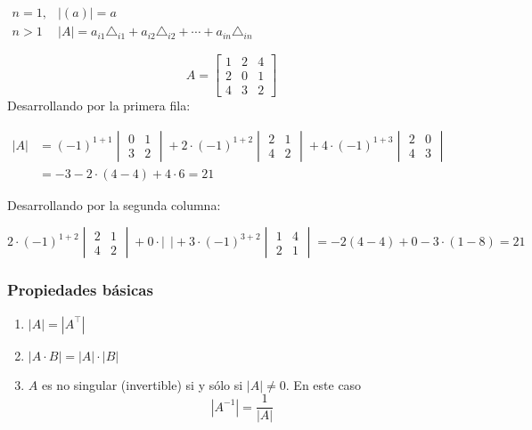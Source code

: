 $\begin{array}{ll}
	n=1, & |(a)|=a\\
	n>1 & |A|=a_{i1}\triangle_{i1}+a_{i2}\triangle_{i2}+\cdots+a_{in}\triangle_{in}
\end{array}$


\Ej
\[ A=\begin{bmatrix}
	1 & 2 & 4\\
	2 & 0 & 1\\
	4 & 3 & 2
\end{bmatrix} \]
Desarrollando por la primera fila:

$\begin{aligned}
	|A|& =(-1)^{1+1}\begin{vmatrix}
		0 & 1\\
		3 & 2
	\end{vmatrix}+2\cdot(-1)^{1+2}\begin{vmatrix}
	2 & 1\\
	4 & 2
	\end{vmatrix}+4\cdot(-1)^{1+3}\begin{vmatrix}
	2 & 0\\
	4 & 3
	\end{vmatrix}\\
	&=-3-2\cdot(4-4)+4\cdot6=21
\end{aligned}$

Desarrollando por la segunda columna:

$2\cdot(-1)^{1+2}\begin{vmatrix}
	2 & 1\\
	4 & 2
\end{vmatrix}+0\cdot|~~|+3\cdot(-1)^{3+2}\begin{vmatrix}
1 & 4\\
2 & 1
\end{vmatrix}=-2(4-4)+0-3\cdot(1-8)=21$
\subsubsection{Propiedades básicas}
\begin{enumerate}[label=\color{lightblue}\arabic*)]
	\item $|A|=|A^\intercal |$
	\item $|A\cdot B|=|A|\cdot|B|$
	\item $A$ es no singular (invertible) si y sólo si $|A|\neq0$. En este caso \[ |A^{-1}|=\dfrac{1}{|A|} \]
\end{enumerate}
